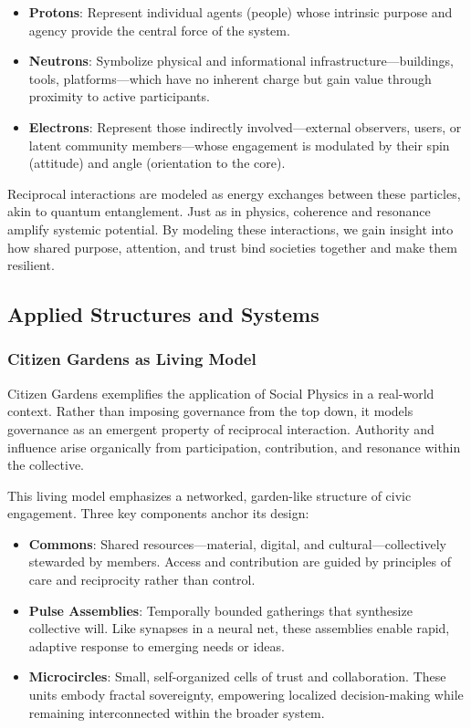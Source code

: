 \documentclass{article}
\theoremstyle{plain}
\theoremstyle{claimstyle}
\begin{document}
\begin{itemize}
    \item \textbf{Protons}: Represent individual agents (people) whose intrinsic purpose and agency provide the central force of the system.
    \item \textbf{Neutrons}: Symbolize physical and informational infrastructure—buildings, tools, platforms—which have no inherent charge but gain value through proximity to active participants.
    \item \textbf{Electrons}: Represent those indirectly involved—external observers, users, or latent community members—whose engagement is modulated by their spin (attitude) and angle (orientation to the core).
\end{itemize}

Reciprocal interactions are modeled as energy exchanges between these particles, akin to quantum entanglement. Just as in physics, coherence and resonance amplify systemic potential. By modeling these interactions, we gain insight into how shared purpose, attention, and trust bind societies together and make them resilient.

\subsection{Applied Structures and Systems}

\subsubsection{Citizen Gardens as Living Model}

Citizen Gardens exemplifies the application of Social Physics in a real-world context. Rather than imposing governance from the top down, it models governance as an emergent property of reciprocal interaction. Authority and influence arise organically from participation, contribution, and resonance within the collective.

This living model emphasizes a networked, garden-like structure of civic engagement. Three key components anchor its design:

\begin{itemize}
    \item \textbf{Commons}: Shared resources—material, digital, and cultural—collectively stewarded by members. Access and contribution are guided by principles of care and reciprocity rather than control.
    \item \textbf{Pulse Assemblies}: Temporally bounded gatherings that synthesize collective will. Like synapses in a neural net, these assemblies enable rapid, adaptive response to emerging needs or ideas.
    \item \textbf{Microcircles}: Small, self-organized cells of trust and collaboration. These units embody fractal sovereignty, empowering localized decision-making while remaining interconnected within the broader system.
\end{itemize}
\end{document}
